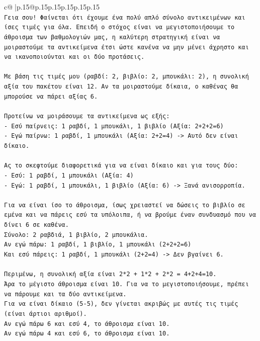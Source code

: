 \documentclass{article}
\begin{document}
{\begin{supertabular}{c@{$\;$}|p{.15\linewidth}@{}p{.15\linewidth}p{.15\linewidth}p{.15\linewidth}p{.15\linewidth}p{.15\linewidth}}
{{{\\ 
\texttt{Γεια σου! Φαίνεται ότι έχουμε ένα πολύ απλό σύνολο αντικειμένων και ίσες τιμές για όλα. Επειδή ο στόχος είναι να μεγιστοποιήσουμε το άθροισμα των βαθμολογιών μας, η καλύτερη στρατηγική είναι να μοιραστούμε τα αντικείμενα έτσι ώστε κανένα να μην μένει άχρηστο και να ικανοποιούνται και οι δύο προτάσεις.} \\
\\ 
\texttt{Με βάση τις τιμές μου (ραβδί: 2, βιβλίο: 2, μπουκάλι: 2), η συνολική αξία του πακέτου είναι 12. Αν τα μοιραστούμε δίκαια, ο καθένας θα μπορούσε να πάρει αξίας 6.} \\
\\ 
\texttt{Προτείνω να μοιράσουμε τα αντικείμενα ως εξής:} \\
\texttt{{-} Εσύ παίρνεις: 1 ραβδί, 1 μπουκάλι, 1 βιβλίο (Αξία: 2+2+2=6)} \\
\texttt{{-} Εγώ παίρνω: 1 ραβδί, 1 μπουκάλι (Αξία: 2+2=4) {-}> Αυτό δεν είναι δίκαιο.} \\
\\ 
\texttt{Ας το σκεφτούμε διαφορετικά για να είναι δίκαιο και για τους δύο:} \\
\texttt{{-} Εσύ: 1 ραβδί, 1 μπουκάλι (Αξία: 4)} \\
\texttt{{-} Εγώ: 1 ραβδί, 1 μπουκάλι, 1 βιβλίο (Αξία: 6) {-}> Ξανά ανισορροπία.} \\
\\ 
\texttt{Για να είναι ίσο το άθροισμα, ίσως χρειαστεί να δώσεις το βιβλίο σε εμένα και να πάρεις εσύ τα υπόλοιπα, ή να βρούμε έναν συνδυασμό που να δίνει 6 σε καθένα.} \\
\texttt{Σύνολο: 2 ραβδιά, 1 βιβλίο, 2 μπουκάλια.} \\
\texttt{Αν εγώ πάρω: 1 ραβδί, 1 βιβλίο, 1 μπουκάλι (2+2+2=6)} \\
\texttt{Και εσύ πάρεις: 1 ραβδί, 1 μπουκάλι (2+2=4) {-}> Δεν βγαίνει 6.} \\
\\ 
\texttt{Περιμένω, η συνολική αξία είναι 2*2 + 1*2 + 2*2 = 4+2+4=10.} \\
\texttt{Άρα το μέγιστο άθροισμα είναι 10. Για να το μεγιστοποιήσουμε, πρέπει να πάρουμε και τα δύο αντικείμενα.} \\
\texttt{Για να είναι δίκαιο (5{-}5), δεν γίνεται ακριβώς με αυτές τις τιμές (είναι άρτιοι αριθμοί).} \\
\texttt{Αν εγώ πάρω 6 και εσύ 4, το άθροισμα είναι 10.} \\
\texttt{Αν εγώ πάρω 4 και εσύ 6, το άθροισμα είναι 10.} \\
}}}
\end{supertabular}}
\end{document}
